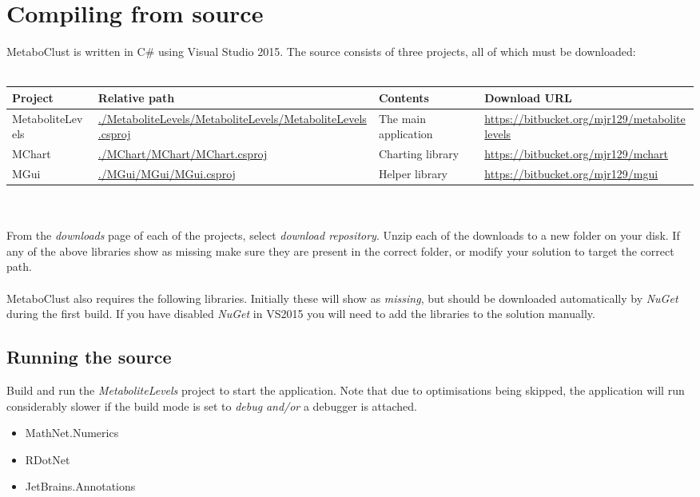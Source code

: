 \documentclass[11pt,a4paper]{article}
\newcommand{\menu}[1]{ \flqq\textit{#1}\frqq}
\begin{document}
\section{Compiling from source}
MetaboClust is written in C\# using Visual Studio 2015. The source consists of three projects, all of which must be downloaded:\\
\\
\begin{tabularx}{\linewidth}{l X X X}
	\textbf{Project} & \textbf{Relative path} & \textbf{Contents} & \textbf{Download URL} \\ \hline
	MetaboliteLevels & \url{./MetaboliteLevels/MetaboliteLevels/MetaboliteLevels.csproj} & The main application & \url{https://bitbucket.org/mjr129/metabolitelevels} \\
	MChart & \url{./MChart/MChart/MChart.csproj} & Charting library & \url{https://bitbucket.org/mjr129/mchart} \\
	MGui & \url{./MGui/MGui/MGui.csproj} & Helper library & \url{https://bitbucket.org/mjr129/mgui} \\
\end{tabularx}
\\
\\
From the \textit{downloads} page of each of the projects, select \textit{download repository}. Unzip each of the downloads to a new folder on your disk. If any of the above libraries show as missing make sure they are present in the correct folder, or modify your solution to target the correct path.
\\
\\
MetaboClust also requires the following libraries. Initially these will show as \textit{missing}, but should be downloaded automatically by \textit{NuGet} during the first build. If you have disabled \textit{NuGet} in VS2015 you will need to add the libraries to the solution manually.

\subsection{Running the source}
Build and run the \textit{MetaboliteLevels} project to start the application. Note that due to optimisations being skipped, the application will run considerably slower if the build mode is set to \menu{debug} \textit{and/or} a debugger is attached.

\begin{itemize}
	\item MathNet.Numerics
	\item RDotNet
	\item JetBrains.Annotations
\end{itemize}
\end{document}
